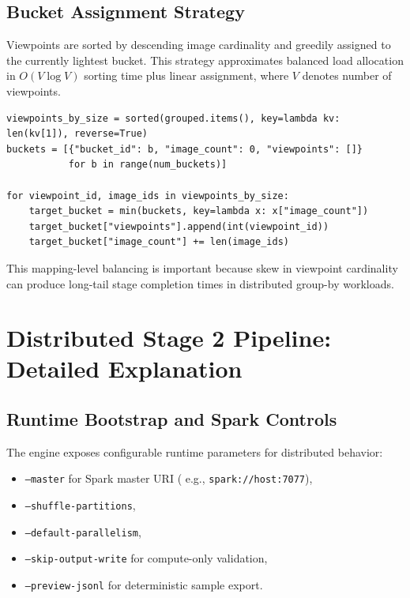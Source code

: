 \documentclass[journal,onecolumn]{IEEEtran}
\begin{document}
\subsection{Bucket Assignment Strategy}
Viewpoints are sorted by descending image cardinality and greedily assigned to the currently lightest bucket. This strategy approximates balanced load allocation in $O(V\log V)$ sorting time plus linear assignment, where $V$ denotes number of viewpoints.

\begin{lstlisting}[style=pycode,caption={Node-bucket assignment logic used for balanced viewpoint distribution.}]
viewpoints_by_size = sorted(grouped.items(), key=lambda kv: len(kv[1]), reverse=True)
buckets = [{"bucket_id": b, "image_count": 0, "viewpoints": []}
           for b in range(num_buckets)]

for viewpoint_id, image_ids in viewpoints_by_size:
    target_bucket = min(buckets, key=lambda x: x["image_count"])
    target_bucket["viewpoints"].append(int(viewpoint_id))
    target_bucket["image_count"] += len(image_ids)
\end{lstlisting}

This mapping-level balancing is important because skew in viewpoint cardinality can produce long-tail stage completion times in distributed group-by workloads.

\section{Distributed Stage 2 Pipeline: Detailed Explanation}

\subsection{Runtime Bootstrap and Spark Controls}
The engine exposes configurable runtime parameters for distributed behavior:
\begin{itemize}
    \item \texttt{--master} for Spark master URI (
    e.g., \texttt{spark://host:7077}),
    \item \texttt{--shuffle-partitions},
    \item \texttt{--default-parallelism},
    \item \texttt{--skip-output-write} for compute-only validation,
    \item \texttt{--preview-jsonl} for deterministic sample export.
\end{itemize}
\end{document}
